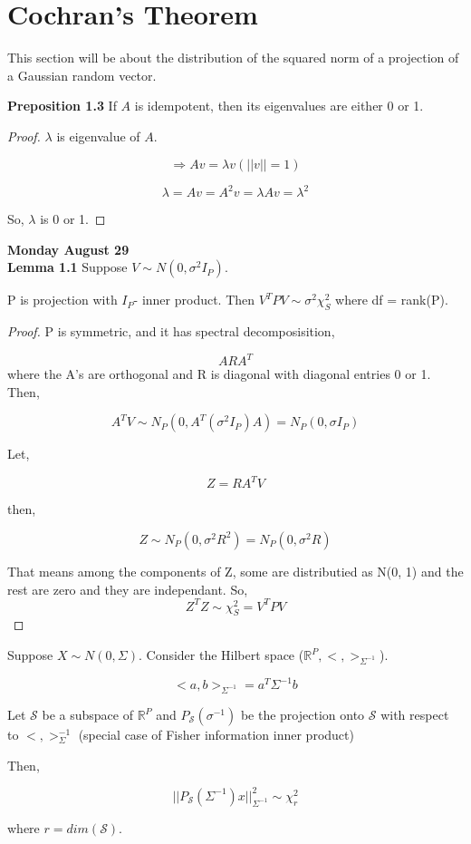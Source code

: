 \documentclass[11pt,fleqn]{book} %
\begin{document}
\section{Cochran's Theorem}

This section will be about the distribution of the squared norm of a projection of a Gaussian random vector. 

\textbf{Preposition 1.3} If $A$ is idempotent, then its eigenvalues are either 0 or 1. 

\begin{proof}
	$\lambda$ is eigenvalue of $A$. 

	$$\Rightarrow Av = \lambda v (||v|| = 1)$$ 

	$$ \lambda = Av = A^2v = \lambda Av = \lambda^2$$

	So, $\lambda$ is 0 or 1.
\end{proof}

\textbf{Monday August 29}\\


 \textbf{Lemma 1.1}
 	Suppose $V \sim N(0, \sigma^2 I_P)$. 

 	P is projection with $I_P$- inner product. 
 	Then $V^T PV \sim \sigma^2 \chi^2_S$ where df = rank(P).

 	\begin{proof}
 		P is symmetric, and it has spectral decomposisition, 

 		$$A R A^T $$
 		where the A's are orthogonal and R is diagonal with diagonal entries 0 or 1.\\

 		Then, 

 		$$A^T V \sim N_P (0, A^T (\sigma^2 I_P)A) = N_P (0, \sigma I_P) $$
 		
 		Let, 

 		$$Z = R A^T V$$

 		then,

 		$$Z \sim N_P (0, \sigma^2 R^2) = N_P (0, \sigma^2 R) $$

 		That means among the components of Z, some are distributied as N(0, 1) and the rest are zero and they are independant. So, 
 		$$Z^T Z \sim \chi^2_S = V^T P V $$
  	\end{proof}

  	\begin{corollary}
  		Suppose $X \sim N(0, \Sigma)$. Consider the Hilbert space ($\mathbb{R}^P, <,>_{\Sigma^{-1}}$). 

  	$$<a,b>_{\Sigma^{-1}} = a^T \Sigma^{-1} b$$

  	Let $\mathscr{S}$ be a subspace of $\mathbb{R}^P$ and $P_\mathscr{S}(\sigma^{-1})$ be the projection onto $\mathscr{S}$ with respect to $<,>_\Sigma^{-1}$ (special case of Fisher information inner product)

  	Then, 

  	$$||P_\mathscr{S}(\Sigma^{-1})x||^2_{\Sigma^{-1}} \sim \chi^2_r $$

  	where $r = dim(\mathscr{S})$.
  	\end{corollary}
\end{document}
